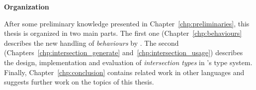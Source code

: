 \textbf{Organization}

After some preliminary knowledge presented in
Chapter~\ref{chp:preliminaries}, this thesis is organized in two main
parts. The first one (Chapter~\ref{chp:behaviours} describes the new
handling of \emph{behaviours} by \dr. The second
(Chapters~\ref{chp:intersection_generate}
and~\ref{chp:intersection_usage}) describes the design, implementation
and evaluation of \emph{intersection types} in \dr's type
system. Finally, Chapter~\ref{chp:conclusion} contains related work in
other languages and suggests further work on the topics of this
thesis.
